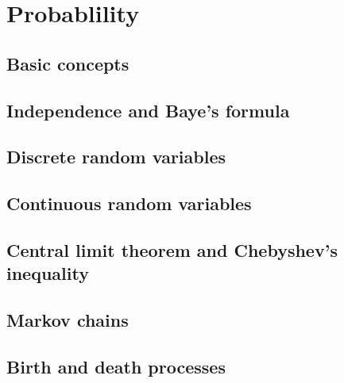 \chapter{Probablility}


\section{Basic concepts}

\section{Independence and Baye's formula}

\section{Discrete random variables}

\section{Continuous random variables}

\section{Central limit theorem and Chebyshev's inequality}

\section{Markov chains}

\section{Birth and death processes}

